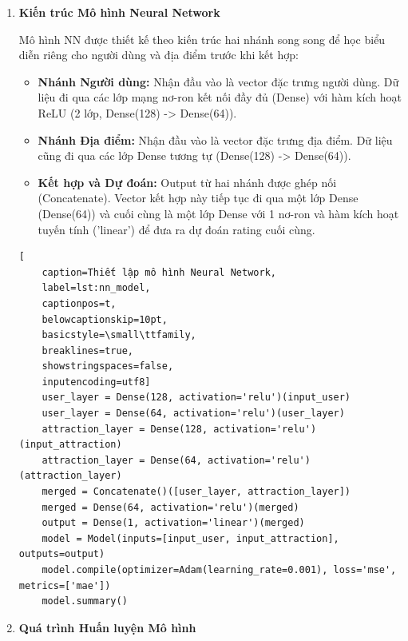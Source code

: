 \begin{enumerate}
    \item \textbf{Kiến trúc Mô hình Neural Network }

Mô hình NN được thiết kế theo kiến trúc hai nhánh song song để học biểu diễn riêng cho người dùng và địa điểm trước khi kết hợp:

\begin{itemize}
    \item \textbf{Nhánh Người dùng:} Nhận đầu vào là vector đặc trưng người dùng. Dữ liệu đi qua các lớp mạng nơ-ron kết nối đầy đủ (Dense) với hàm kích hoạt ReLU (2 lớp, Dense(128) -> Dense(64)).
    \item \textbf{Nhánh Địa điểm:} Nhận đầu vào là vector đặc trưng địa điểm. Dữ liệu cũng đi qua các lớp Dense tương tự (Dense(128) -> Dense(64)).
    \item \textbf{Kết hợp và Dự đoán:} Output từ hai nhánh được ghép nối (Concatenate). Vector kết hợp này tiếp tục đi qua một lớp Dense (Dense(64)) và cuối cùng là một lớp Dense với 1 nơ-ron và hàm kích hoạt tuyến tính ('linear') để đưa ra dự đoán rating cuối cùng.
\end{itemize}

\lstset{language=python}
\begin{lstlisting}[
    caption=Thiết lập mô hình Neural Network,
    label=lst:nn_model,
    captionpos=t,
    belowcaptionskip=10pt,
    basicstyle=\small\ttfamily,
    breaklines=true,
    showstringspaces=false,
    inputencoding=utf8] 
    user_layer = Dense(128, activation='relu')(input_user)
    user_layer = Dense(64, activation='relu')(user_layer)
    attraction_layer = Dense(128, activation='relu')(input_attraction)
    attraction_layer = Dense(64, activation='relu')(attraction_layer)
    merged = Concatenate()([user_layer, attraction_layer])
    merged = Dense(64, activation='relu')(merged)
    output = Dense(1, activation='linear')(merged)
    model = Model(inputs=[input_user, input_attraction], outputs=output)
    model.compile(optimizer=Adam(learning_rate=0.001), loss='mse', metrics=['mae'])
    model.summary()

\end{lstlisting}
    
    \item \textbf{Quá trình Huấn luyện Mô hình}
   

\end{enumerate}
